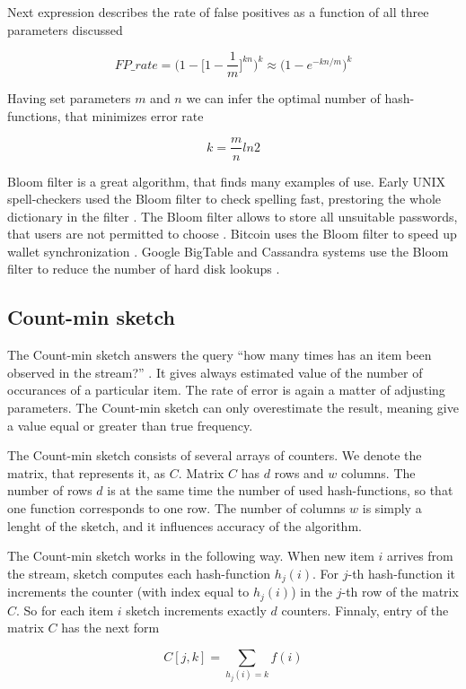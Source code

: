 Next expression describes the rate of false positives as a function of all three parameters discussed

$$
FP\_rate = \Bigg(1 - \Bigg[1 - \frac{1}{m}\Bigg]^{kn}\Bigg)^k \approx \Big(1 - e^{-kn/m}\Big)^k
$$

Having set parameters $m$ and $n$ we can infer the optimal number of hash-functions, that minimizes error rate

$$
k = \frac{m}{n}ln2
$$

Bloom filter is a great algorithm, that finds many examples of use.
Early UNIX spell-checkers used the Bloom filter to check spelling fast, prestoring the whole dictionary in the filter \cite{BroderMitzenmacher2005}.
The Bloom filter allows to store all unsuitable passwords, that users are not permitted to choose \cite{BroderMitzenmacher2005}.
Bitcoin uses the Bloom filter to speed up wallet synchronization \cite{BitcoinFoundation2012}.
Google BigTable and Cassandra systems use the Bloom filter to reduce the number of hard disk lookups \cite{Bigtable/Chang_Dean_Ghemawat}.

\subsection{Count-min sketch}

The Count-min sketch answers the query ``how many times has an item been observed in the stream?'' \cite{Cormode}.
It gives always estimated value of the number of occurances of a particular item.
The rate of error is again a matter of adjusting parameters.
The Count-min sketch can only overestimate the result, meaning give a value equal or greater than true frequency.

The Count-min sketch consists of several arrays of counters.
We denote the matrix, that represents it, as $C$.
Matrix $C$ has $d$ rows and $w$ columns.
The number of rows $d$ is at the same time the number of used hash-functions, so that one function corresponds to one row.
The number of columns $w$ is simply a lenght of the sketch, and it influences accuracy of the algorithm.

The Count-min sketch works in the following way.
When new item $i$ arrives from the stream, sketch computes each hash-function $h_j(i)$.
For $j$-th hash-function it increments the counter (with index equal to $h_j(i)$) in the $j$-th row of the matrix $C$.
So for each item $i$ sketch increments exactly $d$ counters.
Finnaly, entry of the matrix $C$ has the next form

$$
C[j, k] = \sum_{h_j(i)=k}f(i)
$$

